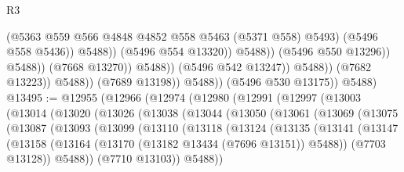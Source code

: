 \begin{lexlean}{R3}
\begin{coremodule}
                                                  (@5363
                                                    @559
                                                    @566
                                                    @4848
                                                    @4852
                                                    @558
                                                    @5463
                                                    (@5371 @558)
                                                    @5493)
                                                  (@5496 @558 @5436))
                                                @5488))
                                            (@5496 @554 @13320))
                                          @5488))
                                      (@5496 @550 @13296))
                                    @5488))
                                (@7668 @13270))
                              @5488))
                          (@5496 @542 @13247))
                        @5488))
                    (@7682 @13223))
                  @5488))
              (@7689 @13198))
            @5488))
        (@5496 @530 @13175))
      @5488)
@13495 := @12955
    (@12966
      (@12974
        (@12980
          (@12991
            (@12997
              (@13003
                (@13014
                  (@13020
                    (@13026
                      (@13038
                        (@13044
                          (@13050
                            (@13061
                              (@13069
                                (@13075
                                  (@13087
                                    (@13093
                                      (@13099
                                        (@13110
                                          (@13118
                                            (@13124
                                              (@13135
                                                (@13141
                                                  (@13147
                                                    (@13158
                                                      (@13164
                                                        (@13170
                                                          (@13182 @13434 (@7696 @13151))
                                                          @5488))
                                                      (@7703 @13128))
                                                    @5488))
                                                (@7710 @13103))
                                              @5488))

\end{coremodule}
\end{lexlean}
